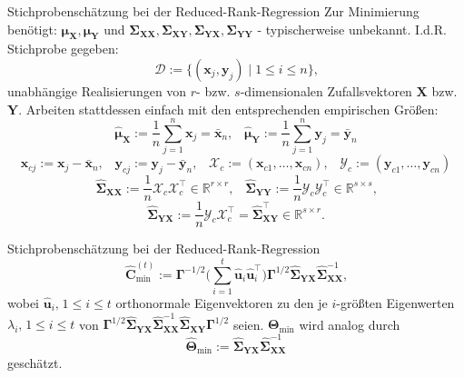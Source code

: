 \documentclass[12pt, aspectratio=169]{beamer}
\newcommand{\R}{\mathbb{R}}
\newcommand{\X}{\mathbf{X}}
\newcommand{\Y}{\mathbf{Y}}
\newcommand{\T}{\bm{\Theta}}
\newcommand{\muu}{\bm{\mu}}
\newcommand{\Ssigma}{\bm{\Sigma}}
\newcommand{\uu}{\mathbf{u}}
\newcommand{\C}{\mathbf{C}}
\newcommand{\Ggamma}{\bm{\Gamma}}
\newcommand{\xx}{\mathbf{x}}
\newcommand{\yy}{\mathbf{y}}
\newcommand{\XX}{\mathcal{X}}
\newcommand{\YY}{\mathcal{Y}}
\begin{document}
\begin{frame}{Stichprobenschätzung bei der Reduced-Rank-Regression}
	Zur Minimierung benötigt: $\muu_\X, \muu_\Y$ und $\Ssigma_{\X\X}, \Ssigma_{\X\Y}, \Ssigma_{\Y\X}, \Ssigma_{\Y\Y}$  - typischerweise unbekannt. 
	I.d.R. Stichprobe gegeben:
	\[\mathcal{D} := \{(\xx_j, \yy_j) \;|\; 1 \leq i \leq n\} \text{,}\]
	unabhängige Realisierungen von $r$- bzw. $s$-dimensionalen Zufallsvektoren $\X$ bzw. $\Y$.
	Arbeiten stattdessen einfach mit den entsprechenden empirischen Größen:
	\[\widehat{\muu}_{\X} := \frac{1}{n} \sum_{j=1}^{n} \mathbf{x}_j = \bar{\xx}_n \text{,} \quad \widehat{\muu}_{\Y} := \frac{1}{n} \sum_{j=1}^{n} \mathbf{y}_j = \bar{\yy}_n\]
	$$\xx_{cj} := \xx_j - \bar{\xx}_n \text{,} \quad \yy_{cj} := \yy_j - \bar{\yy}_n \text{,} \quad \XX_c := (\xx_{c1},\dots,\xx_{cn}) \text{,} \quad \YY_c := (\yy_{c1},\dots,\yy_{cn})$$
	$$ \widehat{\Ssigma}_{\X\X} := \frac{1}{n} \XX_c \XX_c^\top \in \R^{r \times r} \text{,} \quad \widehat{\Ssigma}_{\Y\Y} := \frac{1}{n} \YY_c \YY_c^\top \in \R^{s \times s} \text{,}$$
	\[\widehat{\Ssigma}_{\Y\X} := \frac{1}{n} \YY_c \XX_c^\top = \widehat{\Ssigma}_{\X\Y}^\top \in \R^{s \times r} \text{.}\]
\end{frame}

\begin{frame}{Stichprobenschätzung bei der Reduced-Rank-Regression}
	$$\widehat{\C}^{(t)}_{\min} := \Ggamma^{-1/2} \biggl( \sum_{i=1}^{t} \widehat{\uu}_i \widehat{\uu}_i^\top \biggr) \Ggamma^{1/2} \widehat{\Ssigma}_{\Y\X} \widehat{\Ssigma}_{\X\X}^{-1} \text{,}$$
	wobei $\widehat{\uu}_i\text{,} \; 1 \leq i \leq t$ orthonormale Eigenvektoren zu den je $i$-größten Eigenwerten $\lambda_i \text{,} \; 1 \leq i \leq t$ von
	$\Ggamma^{1/2} \widehat{\Ssigma}_{\Y\X} \widehat{\Ssigma}_{\X\X}^{-1} \widehat{\Ssigma}_{\X\Y} \Ggamma^{1/2}$ seien. $\T_{\min}$ wird analog durch
	$$\widehat{\T}_{\min} := \widehat{\Ssigma}_{\Y\X} \widehat{\Ssigma}_{\X\X}^{-1}$$
	geschätzt.
\end{frame}
\end{document}
